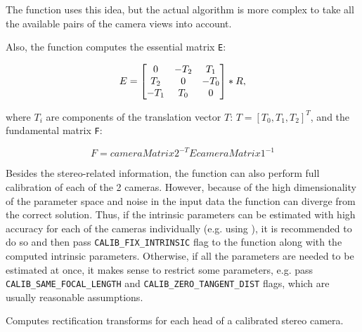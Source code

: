 The function uses this idea, but the actual algorithm is more complex to take all the available pairs of the camera views into account.

Also, the function computes the essential matrix \texttt{E}:

\[
E=
\begin{bmatrix} 0 & -T_2 & T_1\\ T_2 & 0 & -T_0\\ -T_1 & T_0 & 0 \end{bmatrix}
*R,
\]

where $T_i$ are components of the translation vector $T:\,T=[T_0, T_1, T_2]^T$,
and the fundamental matrix \texttt{F}:

\[F = cameraMatrix2^{-T} E cameraMatrix1^{-1}\]

Besides the stereo-related information, the function can also perform full calibration of each of the 2 cameras. However, because of the high dimensionality of the parameter space and noise in the input data the function can diverge from the correct solution. Thus, if the intrinsic parameters can be estimated with high accuracy for each of the cameras individually (e.g. using ), it is recommended to do so and then pass \texttt{CALIB\_FIX\_INTRINSIC} flag to the function along with the computed intrinsic parameters. Otherwise, if all the parameters are needed to be estimated at once, it makes sense to restrict some parameters, e.g. pass \texttt{CALIB\_SAME\_FOCAL\_LENGTH} and \texttt{CALIB\_ZERO\_TANGENT\_DIST} flags, which are usually reasonable assumptions. 


\label{stereoRectify}
Computes rectification transforms for each head of a calibrated stereo camera.

